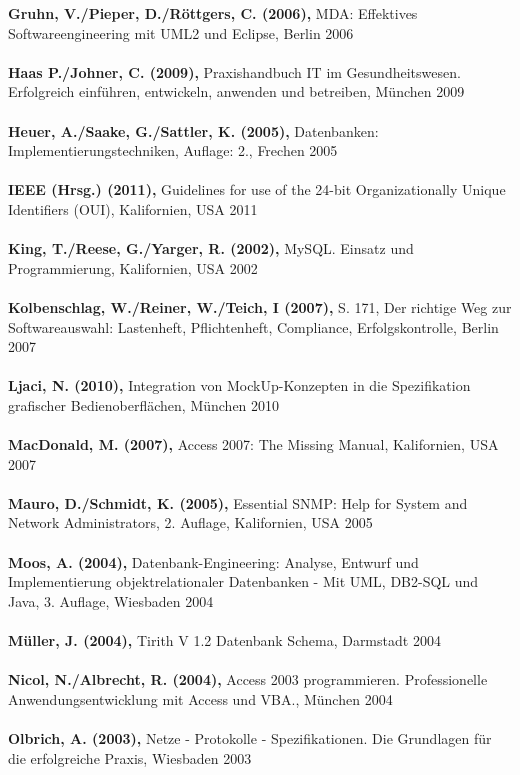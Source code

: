 \textbf{Gruhn, V./Pieper, D./Röttgers, C. (2006),} MDA: Effektives Softwareengineering mit UML2 und Eclipse, Berlin 2006\\\\
\textbf{Haas P./Johner, C. (2009),} Praxishandbuch IT im Gesundheitswesen. Erfolgreich einführen, entwickeln, anwenden und betreiben, München 2009\\\\
\textbf{Heuer, A./Saake, G./Sattler, K. (2005),} Datenbanken: Implementierungstechniken, Auflage: 2., Frechen 2005\\\\
\textbf{IEEE (Hrsg.) (2011),} Guidelines for use of the 24-bit Organizationally Unique Identifiers (OUI), Kalifornien, USA 2011\\\\
\textbf{King, T./Reese, G./Yarger, R. (2002),} MySQL. Einsatz und Programmierung, Kalifornien, USA 2002\\\\
\textbf{Kolbenschlag, W./Reiner, W./Teich, I (2007),} S. 171, Der richtige Weg zur Softwareauswahl: Lastenheft, Pflichtenheft, Compliance, Erfolgskontrolle, Berlin 2007\\\\
\textbf{Ljaci, N. (2010),} Integration von MockUp-Konzepten in die Spezifikation grafischer Bedienoberflächen, München 2010\\\\
\textbf{MacDonald, M. (2007),} Access 2007: The Missing Manual, Kalifornien, USA 2007\\\\
\textbf{Mauro, D./Schmidt, K. (2005),} Essential SNMP: Help for System and Network Administrators, 2. Auflage, Kalifornien, USA 2005\\\\
\textbf{Moos, A. (2004),} Datenbank-Engineering: Analyse, Entwurf und Implementierung objektrelationaler Datenbanken - Mit UML, DB2-SQL und Java, 3. Auflage, Wiesbaden 2004\\\\
\textbf{Müller, J. (2004),} Tirith V 1.2 Datenbank Schema, Darmstadt 2004\\\\ 
\textbf{Nicol, N./Albrecht, R. (2004),} Access 2003 programmieren. Professionelle Anwendungsentwicklung mit Access und VBA., München 2004\\\\
\textbf{Olbrich, A. (2003),} Netze - Protokolle - Spezifikationen. Die Grundlagen für die erfolgreiche Praxis, Wiesbaden 2003\\\\

